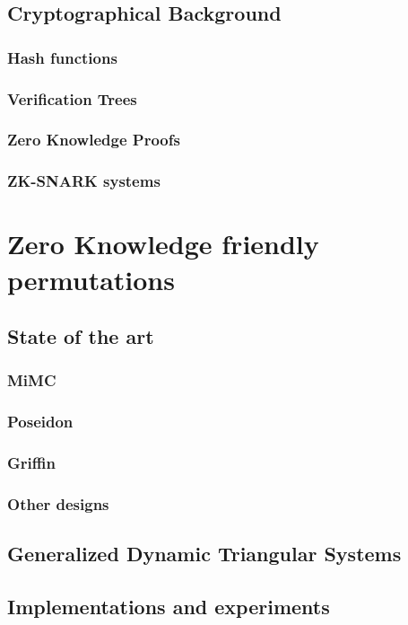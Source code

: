 \documentclass[target=mst]{thud}
\theoremstyle{definition}
\theoremstyle{plain}
\theoremstyle{remark}
\begin{document}

\chapter{Cryptographical Background}
\section{Hash functions}
\section{Verification Trees}
\section{Zero Knowledge Proofs}
\section{ZK-SNARK systems}

\part{Zero Knowledge friendly permutations}\label{part:zk-hash}
\chapter{State of the art}
\section{MiMC}
\section{Poseidon}
\section{Griffin}
\section{Other designs}
\chapter{Generalized Dynamic Triangular Systems}

\chapter{Implementations and experiments}
\end{document}
